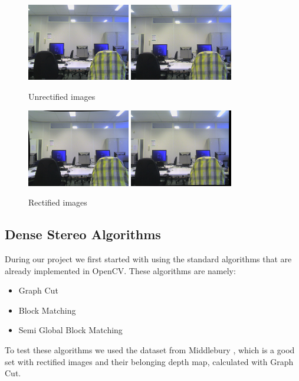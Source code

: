 \documentclass[a4paper]{article}
\begin{document}
\begin{figure}[h] \centering
  \includegraphics[width=0.4\textwidth]{leftown}
  \includegraphics[width=0.4\textwidth]{rightown}
  \caption{Unrectified images}
  \label{unrectified}

  \includegraphics[width=0.4\textwidth]{leftownr}
  \includegraphics[width=0.4\textwidth]{rightownr}
  \caption{Rectified images}
  \label{rectified}
\end{figure} \newpage

\subsection{Dense Stereo Algorithms}
During our project we first started with using the standard algorithms
that are already implemented in OpenCV. These algorithms are namely:
\begin{itemize}
\item Graph Cut
\item Block Matching
\item Semi Global Block Matching
\end{itemize}
To test these algorithms we used the dataset from Middlebury
\cite{middlebury}, which is a good set with rectified images and their
belonging depth map, calculated with Graph Cut.
\end{document}
